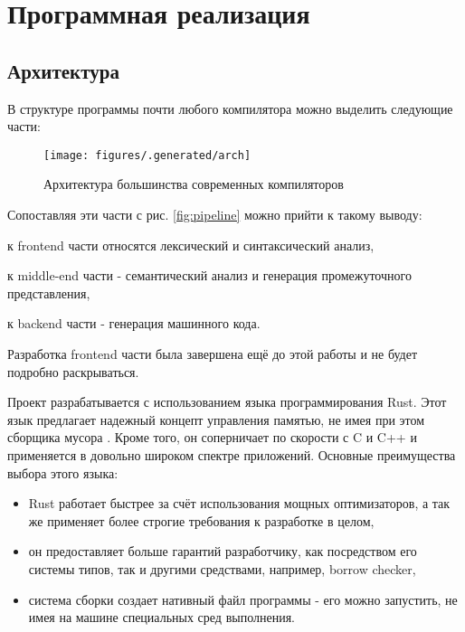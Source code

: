 \chapter{Программная реализация}
\label{ch:chap3_soft_architecture}
\section{Архитектура}
\label{sec:architecture}

В структуре программы почти любого компилятора можно выделить следующие части:

\begin{figure}[H]
    \centering
    \texttt{[image: figures/.generated/arch]}
    \caption{Архитектура большинства современных компиляторов}
    \label{fig:arch}
\end{figure}

Сопоставляя эти части с рис. \ref{fig:pipeline} можно прийти к такому выводу:
\begin{inparaenum}[1)]
    \item к frontend части относятся лексический и синтаксический анализ,
    \item к middle-end части - семантический анализ и генерация промежуточного представления,
    \item к backend части - генерация машинного кода.
\end{inparaenum}
Разработка frontend части была завершена ещё до этой работы и не будет подробно раскрываться.

Проект разрабатывается с использованием языка программирования Rust.
Этот язык предлагает надежный концепт управления памятью, не имея при этом сборщика мусора \cite{RustMemory}.
Кроме того, он соперничает по скорости с C и C++ и применяется в довольно широком спектре приложений.
Основные преимущества выбора этого языка:
\begin{itemize}
    \item Rust работает быстрее за счёт использования мощных оптимизаторов, а так же применяет более строгие требования к разработке в целом,
    \item он предоставляет больше гарантий разработчику, как посредством его системы типов, так и другими средствами, например, borrow checker,
    \item система сборки создает нативный файл программы - его можно запустить, не имея на машине специальных сред выполнения.
\end{itemize}

